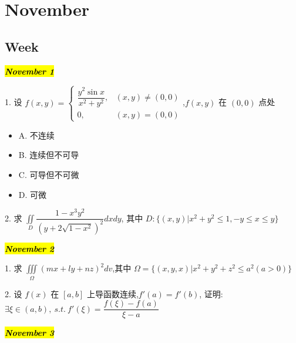 \chapter{November}
\section{Week }
\hl{\textbf{\textit{November 1}}}

1. 设 $f(x,y)=
\begin{cases}
	\dfrac{y^2\sin x}{x^2+y^2}, &(x,y)\neq (0,0)\\
	0, &(x,y)=(0,0)
\end{cases}$,$f(x,y)$ 在 $(0,0)$ 点处
\begin{itemize}
	\item A. 不连续
	\item B. 连续但不可导
	\item C. 可导但不可微
	\item D. 可微
\end{itemize}
\begin{solution}
	
\end{solution}

2. 求 $\displaystyle{\iint\limits_{D}\dfrac{1-x^3y^2}{(y+2\sqrt{1-x^2})^2}dxdy}$, 其中 $D:\{(x,y)|x^2+y^2\leq 1,-y\leq x\leq y\}$
\begin{solution}
	
\end{solution}

\hl{\textbf{\textit{November 2}}}

1. 求 $\displaystyle{\iiint\limits_{\Omega}(mx+ly+nz)^2dv}$,其中 $\Omega=\{(x,y,x)|x^2+y^2+z^2\leq a^2(a>0)\}$
\begin{solution}
	
\end{solution}

2. 设 $f(x)$ 在 $[a,b]$ 上导函数连续,$f'(a)=f'(b)$, 证明: $\exists \xi\in(a,b),\ s.t.\ f'(\xi)=\dfrac{f(\xi)-f(a)}{\xi-a}$
\begin{solution}
	
\end{solution}

\hl{\textbf{\textit{November 3}}}


